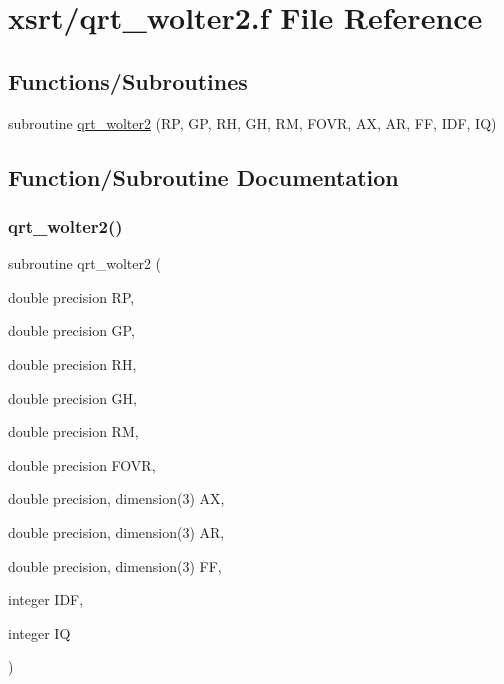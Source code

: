 \hypertarget{qrt__wolter2_8f}{}\section{xsrt/qrt\+\_\+wolter2.f File Reference}
\label{qrt__wolter2_8f}
\subsection*{Functions/\+Subroutines}
\begin{DoxyCompactItemize}
\item 
subroutine \hyperlink{qrt__wolter2_8f_ada6c715f71a2beb976522f40072ab742}{qrt\+\_\+wolter2} (RP, GP, RH, GH, RM, F\+O\+VR, AX, AR, FF, I\+DF, IQ)
\end{DoxyCompactItemize}


\subsection{Function/\+Subroutine Documentation}
\mbox{\label{qrt__wolter2_8f_ada6c715f71a2beb976522f40072ab742}} 
\subsubsection{\texorpdfstring{qrt\+\_\+wolter2()}{qrt\_wolter2()}}
{\footnotesize\ttfamily subroutine qrt\+\_\+wolter2 (\begin{DoxyParamCaption}\item[{double precision}]{RP,  }\item[{double precision}]{GP,  }\item[{double precision}]{RH,  }\item[{double precision}]{GH,  }\item[{double precision}]{RM,  }\item[{double precision}]{F\+O\+VR,  }\item[{double precision, dimension(3)}]{AX,  }\item[{double precision, dimension(3)}]{AR,  }\item[{double precision, dimension(3)}]{FF,  }\item[{integer}]{I\+DF,  }\item[{integer}]{IQ }\end{DoxyParamCaption})}

